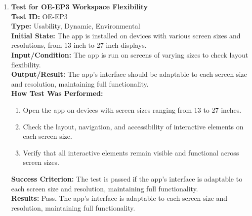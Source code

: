 \documentclass[12pt, titlepage]{article}
\begin{document}
\begin{enumerate}
    \item \textbf{Test for OE-EP3 Workspace Flexibility} \\
      \newline
      \textbf{Test ID:} OE-EP3 \\
      \textbf{Type:} Usability, Dynamic, Environmental \\
      \textbf{Initial State:} The app is installed on devices with various screen sizes and resolutions, from 13-inch to 
      27-inch displays. \\
      \textbf{Input/Condition:} The app is run on screens of varying sizes to check layout flexibility. \\
      \textbf{Output/Result:} The app’s interface should be adaptable to each screen size and resolution, maintaining 
      full functionality. \\
      \textbf{How Test Was Performed:}
      \begin{enumerate}
          \item Open the app on devices with screen sizes ranging from 13 to 27 inches.
          \item Check the layout, navigation, and accessibility of interactive elements on each screen size.
          \item Verify that all interactive elements remain visible and functional across screen sizes.
      \end{enumerate}
      \textbf{Success Criterion:} The test is passed if the app’s interface is adaptable to each screen size and resolution, maintaining full functionality.\\
      \textbf{Results:} Pass. The app's interface is adaptable to each screen size and resolution, maintaining full functionality.\\


\end{enumerate}
\end{document}

